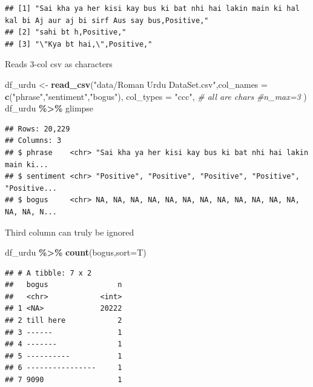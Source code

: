 \documentclass[
]{article}
\newenvironment{Shaded}{\begin{snugshade}}{\end{snugshade}}
\newcommand{\CommentTok}[1]{\textcolor[rgb]{0.56,0.35,0.01}{\textit{#1}}}
\newcommand{\DataTypeTok}[1]{\textcolor[rgb]{0.13,0.29,0.53}{#1}}
\newcommand{\KeywordTok}[1]{\textcolor[rgb]{0.13,0.29,0.53}{\textbf{#1}}}
\newcommand{\NormalTok}[1]{#1}
\newcommand{\OperatorTok}[1]{\textcolor[rgb]{0.81,0.36,0.00}{\textbf{#1}}}
\newcommand{\StringTok}[1]{\textcolor[rgb]{0.31,0.60,0.02}{#1}}
\begin{document}
\begin{verbatim}
## [1] "Sai kha ya her kisi kay bus ki bat nhi hai lakin main ki hal kal bi Aj aur aj bi sirf Aus say bus,Positive,"
## [2] "sahi bt h,Positive,"                                                                                        
## [3] "\"Kya bt hai,\",Positive,"
\end{verbatim}

Reads 3-col csv as characters

\begin{Shaded}
\begin{Highlighting}[]
\NormalTok{df\_urdu \textless{}{-}}\StringTok{ }\KeywordTok{read\_csv}\NormalTok{(}\StringTok{"data/Roman Urdu DataSet.csv"}\NormalTok{,}\DataTypeTok{col\_names =} \KeywordTok{c}\NormalTok{(}\StringTok{"phrase"}\NormalTok{,}\StringTok{"sentiment"}\NormalTok{,}\StringTok{"bogus"}\NormalTok{),}
                    \DataTypeTok{col\_types =} \StringTok{"ccc"}\NormalTok{, }\CommentTok{\# all are chars}
                    \CommentTok{\#n\_max=3}
\NormalTok{                    )}
\NormalTok{df\_urdu }\OperatorTok{\%\textgreater{}\%}\StringTok{ }\NormalTok{glimpse}
\end{Highlighting}
\end{Shaded}

\begin{verbatim}
## Rows: 20,229
## Columns: 3
## $ phrase    <chr> "Sai kha ya her kisi kay bus ki bat nhi hai lakin main ki...
## $ sentiment <chr> "Positive", "Positive", "Positive", "Positive", "Positive...
## $ bogus     <chr> NA, NA, NA, NA, NA, NA, NA, NA, NA, NA, NA, NA, NA, NA, N...
\end{verbatim}

Third column can truly be ignored

\begin{Shaded}
\begin{Highlighting}[]
\NormalTok{df\_urdu }\OperatorTok{\%\textgreater{}\%}\StringTok{ }\KeywordTok{count}\NormalTok{(bogus,}\DataTypeTok{sort=}\NormalTok{T)}
\end{Highlighting}
\end{Shaded}

\begin{verbatim}
## # A tibble: 7 x 2
##   bogus                n
##   <chr>            <int>
## 1 <NA>             20222
## 2 till here            2
## 3 ------               1
## 4 -------              1
## 5 ----------           1
## 6 ----------------     1
## 7 9090                 1
\end{verbatim}
\end{document}
